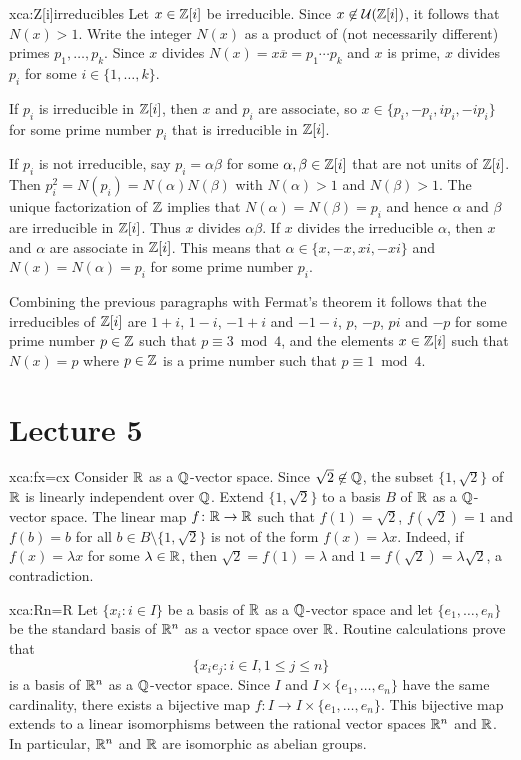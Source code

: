 \begin{sol}{xca:Z[i]irreducibles}
	Let $x\in\mathbb{Z}[i]$ be irreducible. Since 
	$x\not\in\mathcal{U}(\mathbb{Z}[i])$, it follows that $N(x)>1$. Write
	the integer $N(x)$ as a product of (not necessarily different) primes $p_1,\dots,p_k$. Since 
	$x$ divides $N(x)=x\overline{x}=p_1\cdots p_k$ and $x$ is prime, 
	$x$ divides $p_i$ for some $i\in\{1,\dots,k\}$. 
	
	If $p_i$ is irreducible in $\mathbb{Z}[i]$, 
	then $x$ and $p_i$ are associate, so $x\in\{p_i,-p_i,ip_i,-ip_i\}$ for some
	prime number $p_i$ that is irreducible in $\mathbb{Z}[i]$. 
	
	If $p_i$ is not irreducible, say $p_i=\alpha\beta$ for some $\alpha,\beta\in\mathbb{Z}[i]$ that
	are not units of $\mathbb{Z}[i]$. Then 
	$p_i^2=N(p_i)=N(\alpha)N(\beta)$ with $N(\alpha)>1$ and $N(\beta)>1$. The unique factorization
	of $\mathbb{Z}$ implies that $N(\alpha)=N(\beta)=p_i$ and hence $\alpha$ and $\beta$ 
	are irreducible in $\mathbb{Z}[i]$. Thus $x$ divides 
	$\alpha\beta$. If $x$ divides the irreducible $\alpha$, 
	then $x$ and $\alpha$ are associate in $\mathbb{Z}[i]$. This means that 
	$\alpha\in\{x,-x,xi,-xi\}$ and $N(x)=N(\alpha)=p_i$ for some prime number $p_i$.  
	
	Combining the previous paragraphs with Fermat's theorem it follows that 
	the irreducibles of $\mathbb{Z}[i]$ are $1+i$, $1-i$, $-1+i$ and $-1-i$, 
	$p$, $-p$, $pi$ and $-p$ for some prime number $p\in\mathbb{Z}$ such that $p\equiv3\bmod 4$, and 
	the elements $x\in\mathbb{Z}[i]$ such that $N(x)=p$ where $p\in\mathbb{Z}$ is a prime number such that $p\equiv1\bmod 4$. 
\end{sol}

\section*{Lecture 5}

\begin{sol}{xca:fx=cx}
    Consider $\mathbb{R}$ as a $\mathbb{Q}$-vector space. 
    Since $\sqrt{2}\not\in\mathbb{Q}$, the subset $\{1,\sqrt{2}\}$ of $\mathbb{R}$ 
    is linearly independent 
    over $\mathbb{Q}$. Extend $\{1,\sqrt{2}\}$ 
    to a basis $B$ of $\mathbb{R}$ as a $\mathbb{Q}$-vector space. The
    linear map $f\colon\mathbb{R}\to\mathbb{R}$ such that
    $f(1)=\sqrt{2}$, $f(\sqrt{2})=1$ and $f(b)=b$ for all $b\in B\setminus\{1,\sqrt{2}\}$ 
    is not of the form $f(x)=\lambda x$. Indeed, if $f(x)=\lambda x$ for some $\lambda\in\mathbb{R}$, 
    then $\sqrt{2}=f(1)=\lambda$ and $1=f(\sqrt{2})=\lambda\sqrt{2}$, a contradiction. 
\end{sol}

\begin{sol}{xca:Rn=R}
    Let $\{x_i:i\in I\}$ be a basis of $\mathbb{R}$ as a $\mathbb{Q}$-vector space and
    let $\{e_1,\dots,e_n\}$ be the standard basis of $\mathbb{R}^n$ as a vector space over $\mathbb{R}$. 
    Routine calculations prove that  
    \[
    \{x_ie_j:i\in I,1\leq j\leq n\}
    \]
    is a basis of $\mathbb{R}^n$ as a $\mathbb{Q}$-vector space. 
    Since
    $I$ and $I\times\{e_1,\dots,e_n\}$ have the same cardinality, 
    there exists a bijective map $f\colon I\to I\times\{e_1,\dots,e_n\}$. This bijective
    map extends to a linear isomorphisms between the rational vector spaces 
    $\mathbb{R}^n$ and
    $\mathbb{R}$. In particular, $\mathbb{R}^n$ and 
    $\mathbb{R}$ are isomorphic as abelian groups. 
\end{sol}

